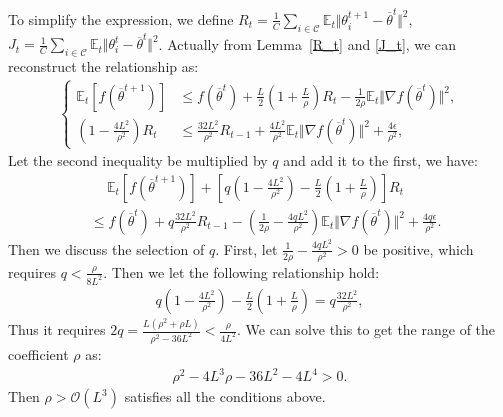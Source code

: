 To simplify the expression, we define $R_t = \frac{1}{C}\sum_{i\in\mathcal{C}}\mathbb{E}_t\Vert\theta_i^{t+1} - \overline{\theta}^{t}\Vert^2$, $J_t = \frac{1}{C}\sum_{i\in\mathcal{C}}\mathbb{E}_t\Vert \theta_i^{t} - \overline{\theta}^{t}\Vert^2$. Actually from Lemma~\ref{R_t} and \ref{J_t}, we can reconstruct the relationship as:
\begin{align*}
\begin{cases}
    \mathbb{E}_t\left[f(\overline{\theta}^{t+1})\right] &\leq f(\overline{\theta}^{t}) + \frac{L}{2}\left(1+\frac{L}{\rho}\right)R_t - \frac{1}{2\rho}\mathbb{E}_t\Vert \nabla f(\overline{\theta}^{t})\Vert^2,\\
    \left(1 - \frac{4L^2}{\rho^2}\right)R_t &\leq \frac{32L^2}{\rho^2}R_{t-1} + \frac{4L^2}{\rho^2}\mathbb{E}_t\Vert\nabla f(\overline{\theta}^{t})\Vert^2 + \frac{4\epsilon}{\rho^2},
\end{cases}
\end{align*}
Let the second inequality be multiplied by $q$ and add it to the first, we have:
\begin{align*}
    &\quad \ \mathbb{E}_t\left[f(\overline{\theta}^{t+1})\right] + \left[q\left(1 - \frac{4L^2}{\rho^2}\right) - \frac{L}{2}\left(1+\frac{L}{\rho}\right)\right]R_t \\
    &\leq f(\overline{\theta}^{t}) + q\frac{32L^2}{\rho^2}R_{t-1} - \left(\frac{1}{2\rho} - \frac{4qL^2}{\rho^2}\right)\mathbb{E}_t\Vert \nabla f(\overline{\theta}^{t})\Vert^2 + \frac{4q\epsilon}{\rho^2}.
\end{align*}
Then we discuss the selection of $q$. First, let $\frac{1}{2\rho} - \frac{4qL^2}{\rho^2} > 0$ be positive, which requires $q < \frac{\rho}{8L^2}$. Then we let the following relationship hold:
\begin{align*}
    q\left(1 - \frac{4L^2}{\rho^2}\right) - \frac{L}{2}\left(1+\frac{L}{\rho}\right) = q\frac{32L^2}{\rho^2},
\end{align*}
Thus it requires $2q = \frac{L(\rho^2+\rho L)}{\rho^2-36L^2}<\frac{\rho}{4L^2}$. We can solve this to get the range of the coefficient $\rho$ as:
\begin{align*}
    \rho^2 - 4L^3\rho - 36L^2 - 4L^4 > 0.
\end{align*}
Then $\rho > \mathcal{O}(L^3)$ satisfies all the conditions above.

